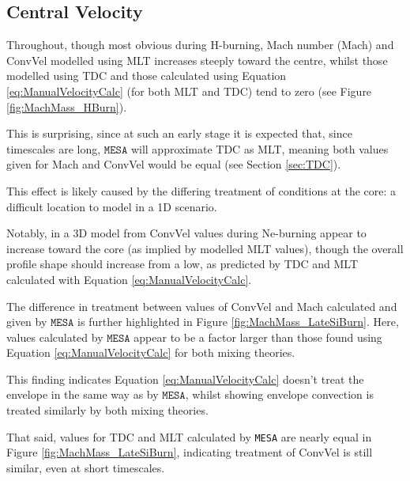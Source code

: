 \subsection{Central Velocity}

Throughout, though most obvious during H-burning, Mach number (\gls{Mach}) and \gls{ConvVel} modelled using \gls{MLT} increases steeply toward the centre, whilst those modelled using \gls{TDC} and those calculated using Equation \ref{eq:ManualVelocityCalc} (for both \gls{MLT} and \gls{TDC}) tend to zero (see Figure \ref{fig:MachMass_HBurn}).

This is surprising, since at such an early stage it is expected that, since timescales are long, $\texttt{MESA}$ will approximate \gls{TDC} as \gls{MLT}, meaning both values given for \gls{Mach} and \gls{ConvVel} would be equal (see Section \ref{sec:TDC}). 

This effect is likely caused by the differing treatment of conditions at the core: a difficult location to model in a 1D scenario. 

Notably, in a 3D model from \citet{Georgy24} \gls{ConvVel} values during Ne-burning appear to increase  toward the core (as implied by modelled \gls{MLT} values), though the overall profile shape should increase from a low, as predicted by \gls{TDC} and \gls{MLT} calculated with Equation \ref{eq:ManualVelocityCalc}.

The difference in treatment between values of \gls{ConvVel} and \gls{Mach} calculated and given by $\texttt{MESA}$ is further highlighted in Figure \ref{fig:MachMass_LateSiBurn}. Here, values calculated by $\texttt{MESA}$ appear to be a factor larger than those found using Equation \ref{eq:ManualVelocityCalc} for both mixing theories. 

This finding indicates Equation \ref{eq:ManualVelocityCalc} doesn't treat the envelope in the same way as by $\texttt{MESA}$, whilst showing envelope convection is treated similarly by both mixing theories. 

That said, values for \gls{TDC} and \gls{MLT} calculated by \texttt{MESA} are nearly equal in Figure \ref{fig:MachMass_LateSiBurn}, indicating treatment of \gls{ConvVel} is still similar, even at short timescales.

